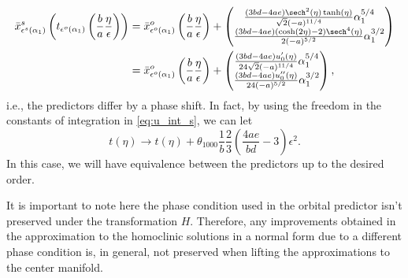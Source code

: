 \begin{align*}
    \bar x_{\epsilon^s(\alpha_1)}^s\left(t_{\epsilon^o(\alpha_1)}\left(\frac{b}{a}\frac{\eta}{\epsilon}\right)\right) 
    &= \bar x_{\epsilon^o(\alpha_1)}^o\left(\frac{b}{a}\frac{\eta}{\epsilon} \right) +
        \begin{pmatrix}
            \frac{(3 b d - 4 a e) \sech^2(\eta) \tanh( \eta )}{\sqrt2 (-a)^{ 11/4 }} \alpha_1^{5/4} \\
            \frac{(3 b d - 4 a e)(\cosh (2 \eta )-2) \sech^4(\eta) }{2 (-a)^{5/2}} \alpha_1^{3/2}
        \end{pmatrix} \\
    &= \bar x_{\epsilon^o(\alpha_1)}^o\left(\frac{b}{a}\frac{\eta}{\epsilon} \right) +
        \begin{pmatrix}
            \frac{(3 b d - 4 a e) u_0'(\eta)}{24\sqrt2 (-a)^{ 11/4 }} \alpha_1^{5/4} \\
            \frac{(3 b d - 4 a e) u_0''(\eta)}{24 (-a)^{5/2}} \alpha_1^{3/2}
        \end{pmatrix},
\end{align*}
i.e., the predictors differ by a phase shift. In fact, by using the freedom in
the constants of integration in \cref{eq:u_int_s}, we can let 
\[
    t(\eta) \rightarrow t(\eta) + \theta_{1000} \frac{1}{b} \frac{2}{3}
    \left(\frac{4 a e}{b d}-3\right) \epsilon^2.
\] 
In this case, we will have equivalence between the predictors up to the desired
order. 

\begin{remark}
It is important to note here the phase condition used in the orbital
predictor isn't preserved under the transformation $H$. Therefore,
any improvements obtained in the approximation to the homoclinic solutions in a
normal form due to a different phase condition is, in general, not preserved
when lifting the approximations to the center manifold.
\end{remark}

